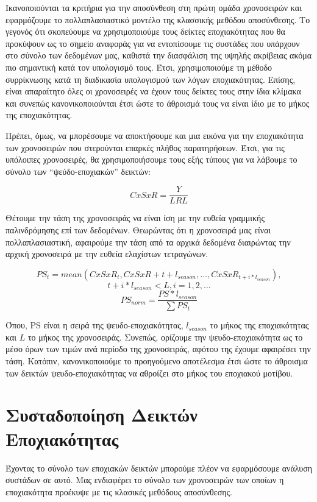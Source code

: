Ικανοποιούνται τα κριτήρια για την αποσύνθεση στη πρώτη ομάδα χρονοσειρών και εφαρμόζουμε το πολλαπλασιαστικό μοντέλο της κλασσικής μεθόδου αποσύνθεσης. Το γεγονός ότι σκοπεύουμε να χρησιμοποιούμε τους δείκτες εποχιακότητας που θα προκύψουν ως το σημείο αναφοράς για να εντοπίσουμε τις συστάδες που υπάρχουν στο σύνολο των δεδομένων μας, καθιστά την διασφάλιση της υψηλής ακρίβειας ακόμα πιο σημαντική κατά τον υπολογισμό τους. Έτσι, χρησιμοποιούμε τη μέθοδο συρρίκνωσης  κατά τη διαδικασία υπολογισμού των λόγων εποχιακότητας. Επίσης, είναι απαραίτητο όλες οι χρονοσειρές να έχουν τους δείκτες τους στην ίδια κλίμακα και συνεπώς κανονικοποιούνται έτσι ώστε το άθροισμά τους να είναι ίδιο με το μήκος της εποχιακότητας.

Πρέπει, όμως, να μπορέσουμε να αποκτήσουμε και μια εικόνα για την εποχιακότητα των χρονοσειρών που στερούνται επαρκές πλήθος παρατηρήσεων. Έτσι, για τις υπόλοιπες χρονοσειρές, θα χρησιμοποιήσουμε τους εξής τύπους για να λάβουμε το σύνολο των ``ψεύδο-εποχιακών'' δεικτών:

\[ CxSxR = \frac{Y}{LRL} \]

Θέτουμε την τάση της χρονοσειράς να είναι ίση με την ευθεία γραμμικής παλινδρόμησης επί των δεδομένων. Θεωρώντας ότι η χρονοσειρά μας είναι πολλαπλασιαστική, αφαιρούμε την τάση από τα αρχικά δεδομένα διαιρώντας την αρχική χρονοσειρά με την ευθεία ελαχίστων τετραγώνων.

\[ PS_t = mean(CxSxR_t, CxSxR+{t+l_{season}}, \dots, CxSxR_{t+i*l_{season}}), \]
\[ t+i*l_{season} < L, i=1,2,\dots \] 
\[ PS_{norm} = \frac{ PS * l_{season}}{\sum{PS_t}} \]

Όπου, PS είναι η σειρά της ψευδο-εποχιακότητας, $l_{season}$ το μήκος της εποχιακότητας και $L$ το μήκος της χρονοσειράς. Συνεπώς, ορίζουμε την ψευδο-εποχιακότητα ως το μέσο όρων των τιμών ανά περίοδο της χρονοσειράς, αφότου της έχουμε αφαιρέσει την τάση. Κατόπιν, κανονικοποιούμε το προηγούμενο αποτέλεσμα έτσι ώστε το άθροισμα των δεικτών ψευδο-εποχιακότητας να αθροίζει στο μήκος του εποχιακού μοτίβου. 

\section{Συσταδοποίηση Δεικτών Εποχιακότητας}

Έχοντας το σύνολο των εποχιακών δεικτών μπορούμε πλέον να εφαρμόσουμε ανάλυση συστάδων  σε αυτό. Μας ενδιαφέρει το σύνολο των χρονοσειρών των οποίων η εποχιακότητα προέκυψε με τις κλασικές μεθόδους αποσύνθεσης. 

